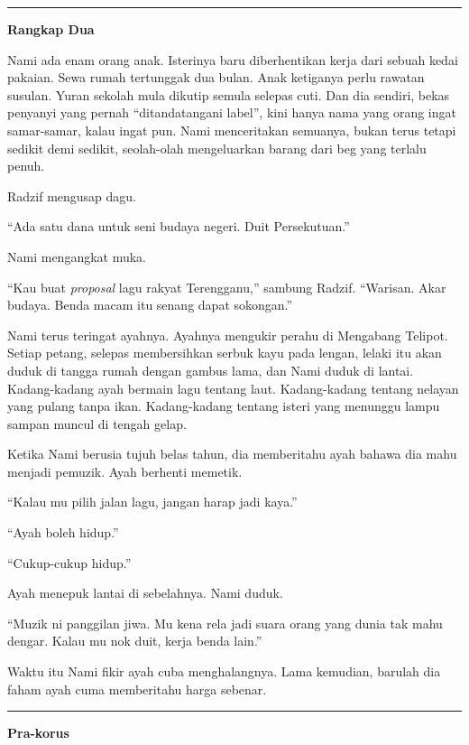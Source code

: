 \documentclass[
  11pt,
  a5paper,
  openany,
  oneside]{book}
\begin{document}
\begin{center}\rule{0.5\linewidth}{0.5pt}\end{center}

\textbf{Rangkap Dua}

Nami ada enam orang anak. Isterinya baru diberhentikan kerja dari sebuah
kedai pakaian. Sewa rumah tertunggak dua bulan. Anak ketiganya perlu
rawatan susulan. Yuran sekolah mula dikutip semula selepas cuti. Dan dia
sendiri, bekas penyanyi yang pernah ``ditandatangani label'', kini hanya
nama yang orang ingat samar-samar, kalau ingat pun. Nami menceritakan
semuanya, bukan terus tetapi sedikit demi sedikit, seolah-olah
mengeluarkan barang dari beg yang terlalu penuh.

Radzif mengusap dagu.

``Ada satu dana untuk seni budaya negeri. Duit Persekutuan.''

Nami mengangkat muka.

``Kau buat \emph{proposal} lagu rakyat Terengganu,'' sambung Radzif.
``Warisan. Akar budaya. Benda macam itu senang dapat sokongan.''

Nami terus teringat ayahnya. Ayahnya mengukir perahu di Mengabang
Telipot. Setiap petang, selepas membersihkan serbuk kayu pada lengan,
lelaki itu akan duduk di tangga rumah dengan gambus lama, dan Nami duduk
di lantai. Kadang-kadang ayah bermain lagu tentang laut. Kadang-kadang
tentang nelayan yang pulang tanpa ikan. Kadang-kadang tentang isteri
yang menunggu lampu sampan muncul di tengah gelap.

Ketika Nami berusia tujuh belas tahun, dia memberitahu ayah bahawa dia
mahu menjadi pemuzik. Ayah berhenti memetik.

``Kalau mu pilih jalan lagu, jangan harap jadi kaya.''

``Ayah boleh hidup.''

``Cukup-cukup hidup.''

Ayah menepuk lantai di sebelahnya. Nami duduk.

``Muzik ni panggilan jiwa. Mu kena rela jadi suara orang yang dunia tak
mahu dengar. Kalau mu nok duit, kerja benda lain.''

Waktu itu Nami fikir ayah cuba menghalangnya. Lama kemudian, barulah dia
faham ayah cuma memberitahu harga sebenar.

\begin{center}\rule{0.5\linewidth}{0.5pt}\end{center}

\textbf{Pra-korus}
\end{document}
